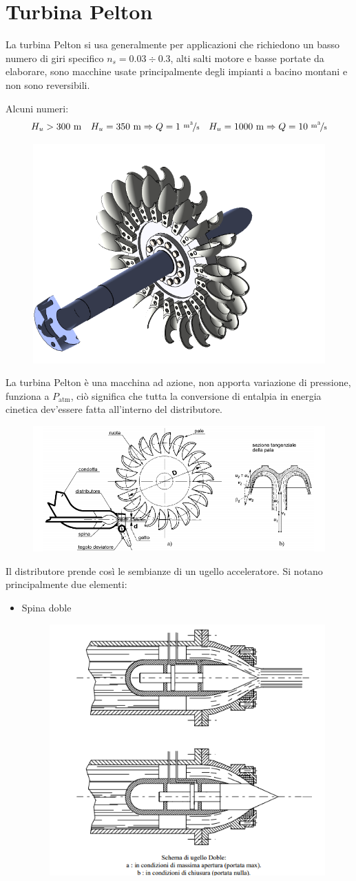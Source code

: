 \documentclass[a4paper, 15pt]{article}
\begin{document}
\section{Turbina Pelton}
\begin{adjustwidth}{2in}{}
	La turbina Pelton si usa generalmente per applicazioni che richiedono un basso numero di giri specifico $n_s = 0.03\div0.3$, alti salti motore e basse portate da elaborare, sono macchine usate principalmente degli impianti a bacino montani e non sono reversibili. 
	
	Alcuni numeri: \[H_u>300~\text{m}\quad H_u=350~\text{m}\Rightarrow Q = 1~\nicefrac{\text{m}^3}{\text{s}} \quad H_u=1000~\text{m}\Rightarrow Q = 10~\nicefrac{\text{m}^3}{\text{s}}\]
	\begin{figure}[H]
		\centering
		\includegraphics[width=0.4\linewidth]{immagini/turbinapelton3}
		\label{fig:turbinapelton3}
	\end{figure}
	La turbina Pelton è una macchina ad azione, non apporta variazione di pressione, funziona a $P_{\text{atm}}$, ciò significa che tutta la conversione di entalpia in energia cinetica dev'essere fatta all'interno del distributore. 
	\begin{figure}[H]
		\centering
		\includegraphics[width=0.7\linewidth]{immagini/turbinapelton2}
		\label{fig:turbinapelton2}
	\end{figure}
	Il distributore prende così le sembianze di un ugello acceleratore. 
\newpage	
	Si notano principalmente due elementi: 
	\begin{itemize}
		\item Spina doble
		 \begin{figure}[H]
		 	\centering
		 	\includegraphics[width=0.4\linewidth]{immagini/turbinapelton4}

\end{figure}
\end{itemize}
\end{adjustwidth}
\end{document}
